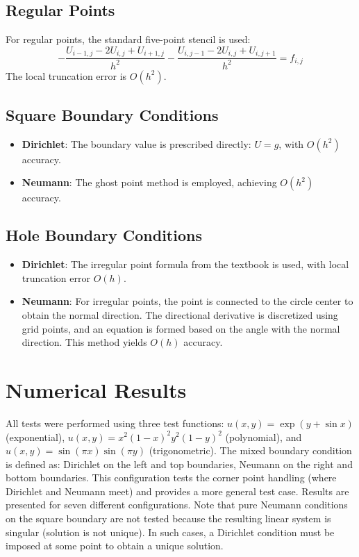\documentclass[12pt,a4paper]{article}
\begin{document}
\subsection{Regular Points}
For regular points, the standard five-point stencil is used:
\[
-\frac{U_{i-1,j} - 2U_{i,j} + U_{i+1,j}}{h^2} - \frac{U_{i,j-1} - 2U_{i,j} + U_{i,j+1}}{h^2} = f_{i,j}
\]
The local truncation error is \(O(h^2)\).

\subsection{Square Boundary Conditions}
\begin{itemize}
    \item \textbf{Dirichlet}: The boundary value is prescribed directly: \(U = g\), with \(O(h^2)\) accuracy.
    \item \textbf{Neumann}: The ghost point method is employed, achieving \(O(h^2)\) accuracy.
\end{itemize}

\subsection{Hole Boundary Conditions}
\begin{itemize}
    \item \textbf{Dirichlet}: The irregular point formula from the textbook is used, with local truncation error \(O(h)\).
    \item \textbf{Neumann}: For irregular points, the point is connected to the circle center to obtain the normal direction. The directional derivative is discretized using grid points, and an equation is formed based on the angle with the normal direction. This method yields \(O(h)\) accuracy.
\end{itemize}

\section{Numerical Results}

All tests were performed using three test functions: \(u(x,y) = \exp(y + \sin x)\) (exponential), \(u(x,y) = x^2(1-x)^2 y^2(1-y)^2\) (polynomial), and \(u(x,y) = \sin(\pi x)\sin(\pi y)\) (trigonometric). The mixed boundary condition is defined as: Dirichlet on the left and top boundaries, Neumann on the right and bottom boundaries. This configuration tests the corner point handling (where Dirichlet and Neumann meet) and provides a more general test case. Results are presented for seven different configurations. Note that pure Neumann conditions on the square boundary are not tested because the resulting linear system is singular (solution is not unique). In such cases, a Dirichlet condition must be imposed at some point to obtain a unique solution.
\end{document}
